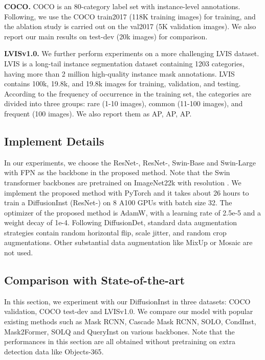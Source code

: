 \documentclass{article}
\begin{document}
\noindent
\textbf{COCO.} COCO is an 80-category label set with instance-level annotations. Following\cite{PointRend}, we use the COCO train2017 (118K training images) for training, and the ablation study is carried out on the val2017 (5K validation images). We also report our main results on test-dev (20k images) for comparison.

\noindent
\textbf{LVISv1.0.} We further perform experiments on a more challenging LVIS dataset\cite{LVIS}. LVIS is a long-tail instance segmentation dataset containing 1203 categories, having more than 2 million high-quality instance mask annotations. LVIS contains 100k, 19.8k, and 19.8k images for training, validation, and testing. According to the frequency of occurrence in the training set, the categories are divided into three groups: rare (1-10 images), common (11-100 images), and frequent (100 images). We also report them as AP, AP, AP.



\subsection{Implement Details}

In our experiments, we choose the ResNet-\cite{ResNet}, ResNet-, Swin-Base\cite{swin} and Swin-Large with FPN\cite{FPN} as the backbone in the proposed method. Note that the Swin transformer backbones are pretrained on ImageNet22k with resolution . We implement the proposed method with PyTorch\cite{pytorch} and it takes about 26 hours to train a DiffusionInst (ResNet-) on 8 A100 GPUs with batch size 32. The optimizer of the proposed method is AdamW\cite{loshchilov2017decoupled}, with a learning rate of 2.5e-5 and a weight decay of 1e-4. Following DiffusionDet, standard data augmentation strategies contain random horizontal flip, scale jitter, and random crop augmentations. Other substantial data augmentation like MixUp\cite{zhang2017mixup} or Mosaic\cite{ge2021yolox} are not used.


\subsection{Comparison with State-of-the-art}

In this section, we experiment with our DiffusionInst in three datasets: COCO validation, COCO test-dev and LVISv1.0. We compare our model with popular existing methods such as Mask RCNN, Cascade Mask RCNN, SOLO, CondInst, Mask2Former, SOLQ and QueryInst on various backbones. Note that the performances in this section are all obtained without pretraining on extra detection data like Objects-365\cite{2020Objects365}.
\end{document}
